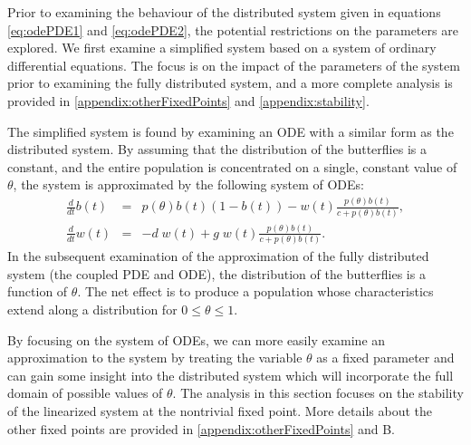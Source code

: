 \documentclass[review,authoryear]{elsarticle}
\begin{document}
Prior to examining the behaviour of the distributed system given in
equations \ref{eq:odePDE1} and \ref{eq:odePDE2}, the potential
restrictions on the parameters are explored. We first examine a
simplified system based on a system of ordinary differential
equations.  The focus is on the impact of the parameters of the
system prior to examining the fully distributed system, and a more complete analysis is provided in 
\ref{appendix:otherFixedPoints} and \ref{appendix:stability}.

The simplified system is found by examining an ODE with a similar form
as the distributed system. By assuming that the distribution of the
butterflies is a constant, and the entire population is concentrated on a single, constant 
value of $\theta$, the system is approximated by the following system
of ODEs:
\begin{eqnarray}
  \label{eq:scaledODE1}
  \frac{d}{dt} b(t) & = &
      p(\theta) b(t) (1 - b(t))
      -  w(t) \frac{p(\theta) b(t)}{c+p(\theta)b(t)}, \\
  \label{eq:scaledODE2}
  \frac{d}{dt} w(t) & = & -d \; w(t) +
       g \; w(t) \frac{p(\theta) b(t) }{c + p(\theta) b(t)}.
\end{eqnarray}
In the subsequent examination of the approximation of the fully distributed system (the coupled PDE and ODE), the distribution of the butterflies is a function of $\theta$. The net effect is to produce a population whose characteristics extend along a distribution for $0\leq\theta\leq 1$.

By focusing on the system of ODEs, we can more easily examine an approximation to
the system by treating the variable $\theta$ as a fixed parameter and
can gain some insight into the distributed system which will incorporate the full domain of possible values of $\theta$. The analysis in
this section focuses on the stability of the linearized system at the
nontrivial fixed point. More details about the other fixed points are
provided in  \ref{appendix:otherFixedPoints} and  B.
\end{document}
